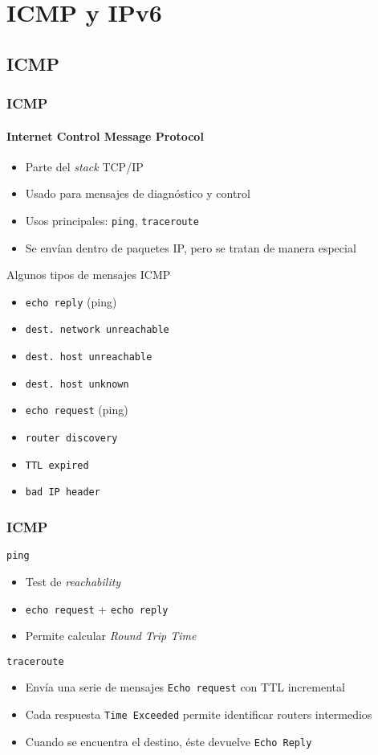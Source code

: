\documentclass[letter]{beamer}
\begin{document}
\section{ICMP y IPv6}

\subsection{ICMP}
\begin{frame}
  \frametitle{ICMP}
  \framesubtitle{Internet Control Message Protocol}
  
  \begin{itemize}
    \item Parte del {\em stack} TCP/IP
    \item Usado para mensajes de diagnóstico y control
    \item Usos principales: {\tt ping}, {\tt traceroute}
    \item Se envían dentro de paquetes IP, pero se tratan de manera especial
  \end{itemize}
  Algunos tipos de mensajes ICMP
  \begin{itemize}
    \item {\tt echo reply} (ping)
    \item {\tt dest. network unreachable}
    \item {\tt dest. host unreachable}
    \item {\tt dest. host unknown}
    \item {\tt echo request} (ping)
    \item {\tt router discovery}
    \item {\tt TTL expired}
    \item {\tt bad IP header}
  \end{itemize}
  
\end{frame}

\begin{frame}
  \frametitle{ICMP}

  {\tt ping}
  \begin{itemize}
    \item Test de {\em reachability}
    \item {\tt echo request} + {\tt echo reply}
    \item Permite calcular {\em Round Trip Time}
  \end{itemize}
  {\tt traceroute}
  \begin{itemize}
    \item Envía una serie de mensajes {\tt Echo request} con TTL incremental
    \item Cada respuesta {\tt Time Exceeded} permite identificar routers intermedios
    \item Cuando se encuentra el destino, éste devuelve {\tt Echo Reply}
  \end{itemize}

\end{frame}
\end{document}
